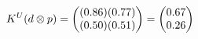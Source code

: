 \documentclass[preview]{standalone}
\begin{document}
\begin{align*}
\special{dvisvgm:raw <g id='unique000'>}K^U(d \otimes p) = \begin{pmatrix} (0.86)(0.77) \\ (0.50)(0.51) \end{pmatrix} = \begin{pmatrix} 0.67 \\ 0.26 \end{pmatrix}\special{dvisvgm:raw </g>}
\end{align*}
\end{document}
